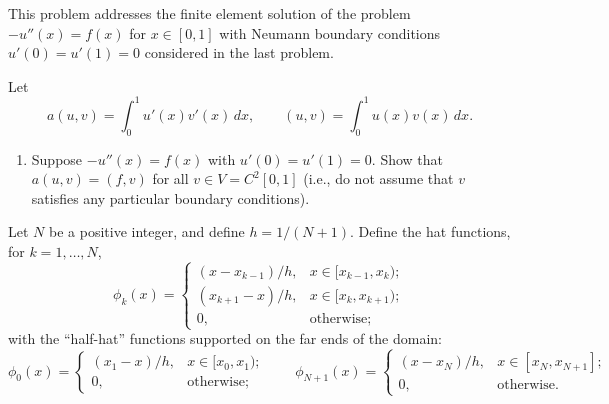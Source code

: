 \vspace*{.5em}
This problem addresses the finite element solution of the problem
$-u''(x) = f(x)$ for $x\in[0,1]$ with Neumann boundary conditions 
$u'(0)=u'(1)=0$ considered in the last problem.

Let
\[ a(u,v) = \int_0^1 u'(x) v'(x)\, dx, 
\qquad 
    (u,v) = \int_0^1 u(x) v(x)\,dx.\]

\begin{enumerate}
\item Suppose $-u''(x) = f(x)$ with $u'(0)=u'(1)=0$.
      Show that $a(u,v) = (f,v)$ for all $v \in V = C^2[0,1]$
      (i.e., do not assume that $v$ satisfies any particular boundary conditions).
\end{enumerate}

     Let $N$ be a positive integer, and define $h = 1/(N+1)$.  
      Define the hat functions, for $k=1,\ldots, N$,
\[
\phi_k(x) = \left\{\begin{array}{ll}
(x-x_{k-1})/h, & x\in[x_{k-1},x_k);\\
(x_{k+1}-x)/h, & x\in[x_k,x_{k+1});\\
0,& \mbox{otherwise;}
\end{array}\right.
\]
      with the ``half-hat'' functions supported on the far ends of the domain:
\[ 
\phi_0(x) = \left\{\begin{array}{ll}
(x_1-x)/h, & x\in[x_{0},x_1);\\
0,& \mbox{otherwise;}
\end{array}\right. \qquad
\phi_{N+1}(x) = \left\{\begin{array}{ll}
(x-x_N)/h, & x\in[x_{N},x_{N+1}];\\
0,& \mbox{otherwise.}
\end{array}\right. \qquad
\]

